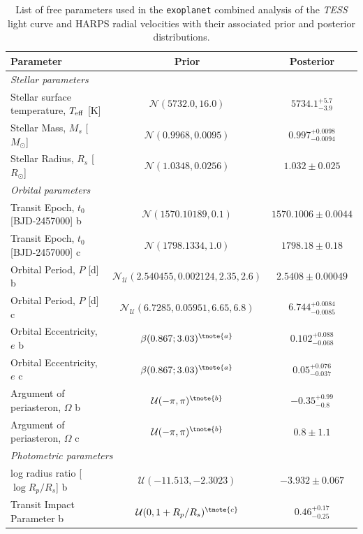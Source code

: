 \documentclass[fleqn,usenatbib]{mnras}
\newcommand{\tess}{{\it TESS}}
\newcommand{\harps}{{HARPS}}
\newcommand{\teff}{$T_{\rm eff}$}
\begin{document}
\onecolumn
\centering
\begin{table}
\caption{List of free parameters used in the \texttt{exoplanet} combined analysis of the \tess{} light curve and \harps{} radial velocities with their associated prior and posterior distributions.}
\label{tab:planetparlong}
\begin{center}
\begin{tabular}{lcc}
\hline
\hline
Parameter & Prior & Posterior\\
\hline
\hline
\multicolumn{3}{l}{\it Stellar parameters}\\
Stellar surface temperature, \teff{} [K] &  $\mathcal{N}(5732.0,16.0)$  &   $ 5734.1^{+5.7}_{-3.9} $ \\
Stellar Mass, $M_s$ [$M_{\odot}$] &  $\mathcal{N}(0.9968,0.0095)$  &   $ 0.997^{+0.0098}_{-0.0094} $ \\
Stellar Radius, $R_s$ [$R_{\odot}$] &  $\mathcal{N}(1.0348,0.0256)$  &   $ 1.032 \pm 0.025 $ \\
\hline
\multicolumn{3}{l}{\it Orbital parameters}\\
Transit Epoch, $t_0$ [BJD-2457000] b &  $\mathcal{N}(1570.10189,0.1)$  &   $ 1570.1006 \pm 0.0044 $ \\
Transit Epoch, $t_0$ [BJD-2457000] c &  $\mathcal{N}(1798.1334,1.0)$  &   $ 1798.18 \pm 0.18 $ \\
Orbital Period, $P$ [d] b &  $\mathcal{N}_{\mathcal{U}}(2.540455,0.002124,2.35,2.6)$  &   $ 2.5408 \pm 0.00049 $ \\
Orbital Period, $P$ [d] c &  $\mathcal{N}_{\mathcal{U}}(6.7285,0.05951,6.65,6.8)$  &   $ 6.744^{+0.0084}_{-0.0085} $ \\
Orbital Eccentricity, $e$ b &  $\beta(0.867;3.03)^{\tnote{a}}$  &   $ 0.102^{+0.088}_{-0.068} $ \\
Orbital Eccentricity, $e$ c &  $\beta(0.867;3.03)^{\tnote{a}}$  &   $ 0.05^{+0.076}_{-0.037} $ \\
Argument of periasteron, $\Omega$ b &  $\mathcal{U}(-\pi,\pi)^{\tnote{b}}$  &   $ -0.35^{+0.99}_{-0.8} $ \\
Argument of periasteron, $\Omega$ c &  $\mathcal{U}(-\pi,\pi)^{\tnote{b}}$  &   $ 0.8 \pm 1.1 $ \\
\hline
\multicolumn{3}{l}{\it Photometric parameters}\\
log radius ratio [$\log{R_p/R_s}$] b &  $\mathcal{U}(-11.513,-2.3023)$  &   $ -3.932 \pm 0.067 $ \\
Transit Impact Parameter b & $\mathcal{U}(0,1+R_p/R_s)^{\tnote{c}}$  &   $ 0.46^{+0.17}_{-0.25} $ \\

\end{tabular}
\end{center}
\end{table}
\end{document}
